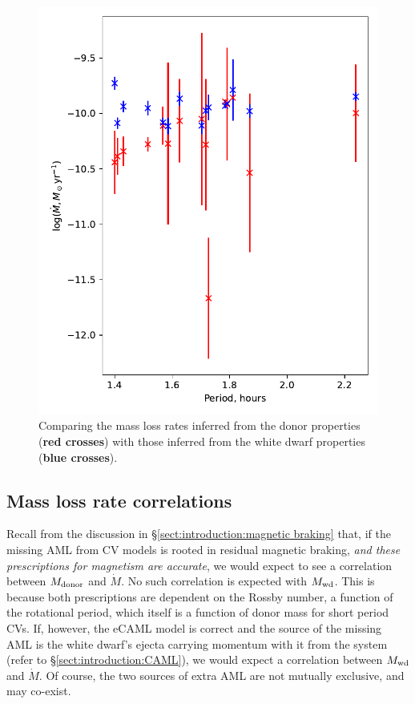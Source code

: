 \begin{figure}
    \centering
    \includegraphics[width=\textwidth]{figures/results/Mdot/compare_mdot_from_donor_vs_wd_vs_period.pdf}
    \caption{Comparing the mass loss rates inferred from the donor properties ({\bf red crosses}) with those inferred from the white dwarf properties ({\bf blue crosses}).}
    \label{fig:discussion:compare Mdot from donor and WD}
\end{figure}


\subsection{Mass loss rate correlations}

Recall from the discussion in \S\ref{sect:introduction:magnetic braking} that, if the missing AML from CV models is rooted in residual magnetic braking, {\it and these prescriptions for magnetism are accurate}, we would expect to see a correlation between $M_{\rm donor}$ and $\dot M$. No such correlation is expected with $M_{\rm wd}$.
This is because both prescriptions are dependent on the Rossby number, a function of the rotational period, which itself is a function of donor mass for short period CVs.
If, however, the eCAML model is correct and the source of the missing AML is the white dwarf's ejecta carrying momentum with it from the system (refer to \S\ref{sect:introduction:CAML}), we would expect a correlation between $M_{\rm wd}$ and $\dot M$.
Of course, the two sources of extra AML are not mutually exclusive, and may co-exist.

